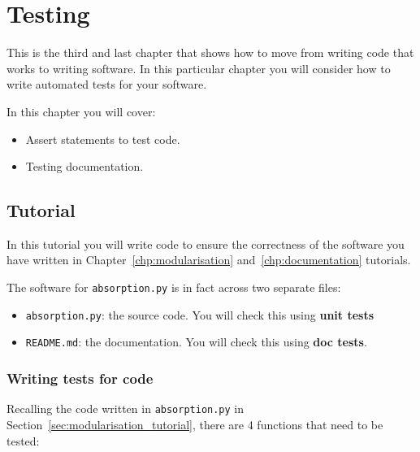 \chapter{Testing}
\label{chp:testing}

This is the third and last chapter that shows how to move from writing code
that works to writing software. In this particular chapter you will consider how
to write automated tests for your software.

\begin{note}
In this chapter you will cover:
\begin{itemize}
\item 

Assert statements to test code.

\item 

Testing documentation.

\end{itemize}
\end{note}





\section{Tutorial}

In this tutorial you will write code to ensure the correctness of the software
you
have written in Chapter~\ref{chp:modularisation} and~\ref{chp:documentation}
tutorials.

The software for \texttt{absorption.py} is in fact across two separate files:
\begin{itemize}
\item 

\texttt{absorption.py}: the source code. You will check this using \textbf{unit tests}

\item 

\texttt{README.md}: the documentation. You will check this using \textbf{doc tests}.

\end{itemize}


\subsection{Writing tests for code}
\label{\detokenize{building-tools/07-testing/tutorial/main:writing-tests-for-code}}

Recalling the code written in \texttt{absorption.py} in
Section~\ref{sec:modularisation_tutorial},
there are 4 functions that need to be tested:

